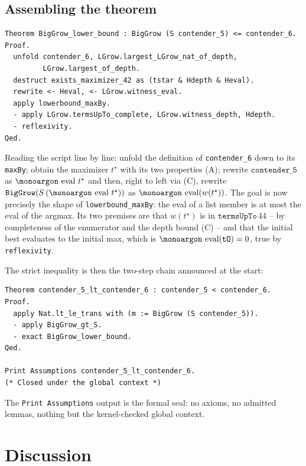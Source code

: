 \documentclass[11pt,a4paper]{article}
\theoremstyle{plain}
\theoremstyle{definition}
\theoremstyle{remark}
\newcommand{\opname}[1]{\mathop{\text{\monoargon #1}}\nolimits}
\newcommand{\eval}{\opname{eval}}
\begin{document}
\subsection{Assembling the theorem}

\begin{lstlisting}
Theorem BigGrow_lower_bound : BigGrow (S contender_5) <= contender_6.
Proof.
  unfold contender_6, LGrow.largest_LGrow_nat_of_depth,
         LGrow.largest_of_depth.
  destruct exists_maximizer_42 as (tstar & Hdepth & Heval).
  rewrite <- Heval, <- LGrow.witness_eval.
  apply lowerbound_maxBy.
  - apply LGrow.termsUpTo_complete, LGrow.witness_depth, Hdepth.
  - reflexivity.
Qed.
\end{lstlisting}

Reading the script line by line: unfold the definition of
\texttt{contender\_6} down to its \texttt{maxBy}; obtain the maximizer
$t^\star$ with its two properties (A); rewrite
$\texttt{contender\_5}$ as $\eval\,t^\star$ and then, right to left
via (C), rewrite $\texttt{BigGrow}(S\,(\eval\,t^\star))$ as
$\eval(w(t^\star))$.  The goal is now precisely the shape of
\texttt{lowerbound\_maxBy}: the eval of a list member is at most the
eval of the argmax.  Its two premises are that $w(t^\star)$ is in
$\texttt{termsUpTo}\,44$ -- by completeness of the enumerator and the
depth bound (C) -- and that the initial best evaluates to the initial
max, which is $\eval(\texttt{tO}) = 0$, true by \texttt{reflexivity}.

The strict inequality is then the two-step chain announced at the
start:

\begin{lstlisting}
Theorem contender_5_lt_contender_6 : contender_5 < contender_6.
Proof.
  apply Nat.lt_le_trans with (m := BigGrow (S contender_5)).
  - apply BigGrow_gt_S.
  - exact BigGrow_lower_bound.
Qed.

Print Assumptions contender_5_lt_contender_6.
(* Closed under the global context *)
\end{lstlisting}

The \texttt{Print Assumptions} output is the formal seal: no axioms,
no admitted lemmas, nothing but the kernel-checked global context.

\section{Discussion}
\end{document}
